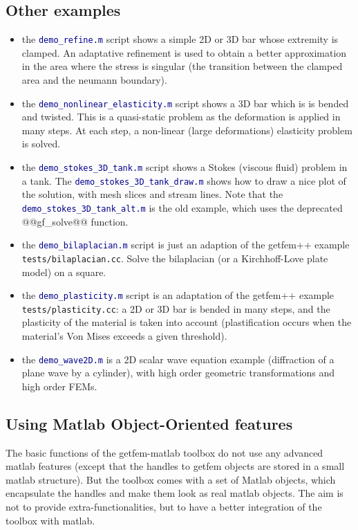 \documentclass[11pt,a4paper]{article}
\newcommand{\sf}[1]{#1}
\newcommand{\kw}[1]{\textcolor{darkblue}{\texttt{#1}}}
\newcommand{\kw}[1]{\textcolor{darkblue}{\texttt{#1}}}
\newcommand{\Mlab}{{\sf Matlab\raisebox{4pt}{\tiny {\textregistered}}}\xspace}
\newcommand{\Mlab}{Matlab\xspace}
\newcommand{\mlab}{{\sf matlab}\xspace}
\newcommand{\gfm}{{\sf getfem-matlab}\xspace}
\begin{document}
\subsection{Other examples}
\begin{itemize}
\item the \kw{demo_refine.m} script shows a
  simple 2D or 3D bar whose extremity is clamped. An adaptative
  refinement is used to obtain a better approximation in the area
  where the stress is singular (the transition between the clamped
  area and the neumann boundary).

\item the \kw{demo_nonlinear_elasticity.m} script shows a 3D bar which is is bended and twisted. This is a quasi-static problem as the deformation is applied in many steps. At each step, a non-linear (large deformations) elasticity problem is solved.

\item the \kw{demo_stokes_3D_tank.m} script shows a Stokes (viscous fluid) problem in a tank. The \kw{demo_stokes_3D_tank_draw.m} shows how to draw a nice plot of the solution, with mesh slices and stream lines. Note that the \kw{demo_stokes_3D_tank_alt.m} is the old example, which uses the deprecated @@gf_solve@@ function.

\item the \kw{demo_bilaplacian.m} script is just an adaption of the getfem++ example \texttt{tests/bilaplacian.cc}. Solve the bilaplacian (or a Kirchhoff-Love plate model) on a square.

\item the \kw{demo_plasticity.m} script is an adaptation of the getfem++ example \texttt{tests/plasticity.cc}: a 2D or 3D bar is bended in many steps, and the plasticity of the material is taken into account (plastification occurs when the material's Von Mises exceeds a given threshold).

\item the \kw{demo_wave2D.m} is a 2D scalar wave equation example (diffraction of a plane wave by a cylinder), with high order geometric transformations and high order FEMs.
\end{itemize}


\subsection{Using Matlab Object-Oriented features}
The basic functions of the \gfm toolbox do not use any advanced \mlab features
(except that the handles to getfem objects are stored in a small \mlab
structure). But the toolbox comes with a set of \Mlab objects, which
encapsulate the handles and make them look as real \mlab objects. The aim is
not to provide extra-functionalities, but to have a better integration of the
toolbox with \mlab.
\end{document}
